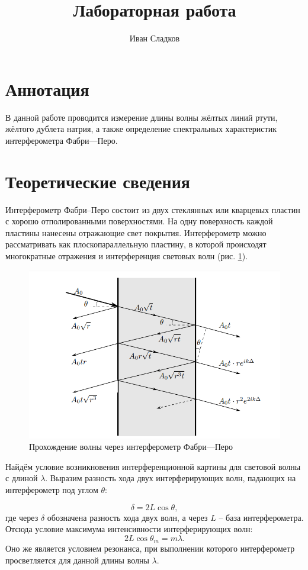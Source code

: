 \documentclass[a4paper]{article}
\title{Лабораторная работа \labnum \space \labname} %
\author{Иван Сладков}
\begin{document}
\maketitle
\thispagestyle{empty}
\section{Аннотация}
В данной работе проводится измерение длины волны жёлтых линий ртути, жёлтого дублета натрия, а также определение спектральных характеристик интерферометра Фабри—Перо. 

\section{Теоретические сведения}

Интерферометр Фабри–Перо состоит из двух стеклянных или кварцевых пластин с хорошо отполированными поверхностями. На одну поверхность каждой пластины нанесены отражающие свет покрытия. Интерферометр можно рассматривать как плоскопараллельную пластину, в которой происходят многократные отражения и интерференция световых волн (рис. \ref{fig:reflections}). 

\begin{figure}[]
	\centering
	\includegraphics[width=0.8\linewidth]{Screenshot_1}
	\caption{Прохождение волны через интерферометр Фабри---Перо}
	\label{fig:reflections}
\end{figure}

Найдём условие возникновения интерференционной картины для световой волны с длиной $ \lambda $. Выразим разность хода двух интерферирующих волн, падающих на интерферометр под углом $ \theta $:

\begin{equation*}\label{key}
	\delta = 2 L \cos \theta,
\end{equation*}
где через $ \delta $ обозначена разность хода двух волн, а через $ L $ -- база интерферометра. Отсюда условие максимума интенсивности интерферирующих волн:
\begin{equation*}\label{key}
	2 L \cos \theta_m = m \lambda.
\end{equation*}
Оно же является условием резонанса, при выполнении которого интерферометр просветляется для данной длины волны $ \lambda $.
\end{document}
